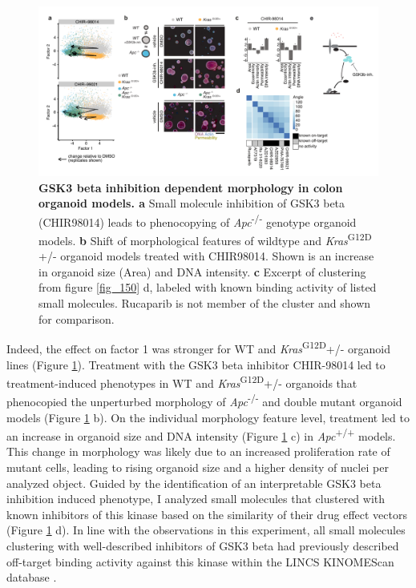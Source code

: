 \begin{flushleft}
\begin{figure}[h]
\centering
\includegraphics[scale=0.75,
                keepaspectratio]{figures/adenomaprofiling/pdf/fig_2_4_1.pdf}
\caption[GSK3 beta inhibition dependent morphology in colon organoid models]{\textbf{GSK3 beta inhibition dependent morphology in colon organoid models. a} Small molecule inhibition of GSK3 beta (CHIR98014) leads to phenocopying of \textit{Apc}\textsuperscript{-/-}  genotype organoid models. \textbf{b} Shift of morphological features of wildtype and \textit{Kras}\textsuperscript{G12D} +/- organoid models treated with CHIR98014. Shown is an increase in organoid size (Area) and DNA intensity. \textbf{c} Excerpt of clustering from figure \ref{fig_150} d, labeled with known binding activity of listed small molecules. Rucaparib is not member of the cluster and shown for comparison.}
\label{fig_185}
\end{figure}
\bigbreak

Indeed, the effect on factor 1 was stronger for WT and \textit{Kras}\textsuperscript{G12D}+/- organoid lines (Figure \ref{fig_185}). Treatment with the GSK3 beta inhibitor CHIR-98014 led to treatment-induced phenotypes in WT and \textit{Kras}\textsuperscript{G12D}+/- organoids that phenocopied the unperturbed morphology of \textit{Apc}\textsuperscript{-/-}  and double mutant organoid models (Figure \ref{fig_185} b). On the individual morphology feature level, treatment led to an increase in organoid size and DNA intensity (Figure \ref{fig_185} c) in \textit{Apc}\textsuperscript{+/+} models. This change in morphology was likely due to an increased proliferation rate of mutant cells, leading to rising organoid size and a higher density of nuclei per analyzed object. Guided by the identification of an interpretable GSK3 beta inhibition induced phenotype, I analyzed small molecules that clustered with known inhibitors of this kinase based on the similarity of their drug effect vectors (Figure \ref{fig_185} d). In line with the observations in this experiment, all small molecules clustering with well-described inhibitors of GSK3 beta had previously described off-target binding activity against this kinase within the LINCS KINOMEScan database \citep{subramanianNextGenerationConnectivity2017}. 
\par 


\end{flushleft}
